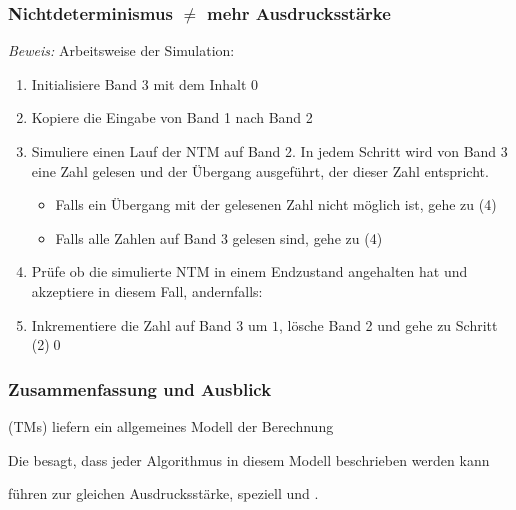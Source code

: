 \documentclass[onlymath]{beamer}
\begin{document}
\begin{frame}[t]\frametitle{Nichtdeterminismus $\neq$ mehr Ausdrucksstärke}


\emph{Beweis:} Arbeitsweise der Simulation:
\begin{enumerate}[(1)]
\item Initialisiere Band 3 mit dem Inhalt $0$
\item Kopiere die Eingabe von Band 1 nach Band 2
\item Simuliere einen Lauf der NTM auf Band 2. In jedem Schritt wird von Band 3 eine Zahl gelesen
und der Übergang ausgeführt, der dieser Zahl entspricht.
\begin{itemize}
\item Falls ein Übergang mit der gelesenen Zahl nicht möglich ist, gehe zu (4)
\item Falls alle Zahlen auf Band 3 gelesen sind, gehe zu (4)
\end{itemize}
\item Prüfe ob die simulierte NTM in einem Endzustand angehalten hat und akzeptiere in diesem Fall, andernfalls:
\item Inkrementiere die Zahl auf Band 3 um $1$, lösche Band 2 und gehe zu Schritt (2)\qed
\end{enumerate}

\end{frame}

% 
% 
% 

\begin{frame}\frametitle{Zusammenfassung und Ausblick}

 (TMs) liefern ein allgemeines Modell der Berechnung
\bigskip

Die  besagt, dass jeder Algorithmus in diesem Modell beschrieben werden kann
\bigskip

 führen zur gleichen Ausdrucksstärke, speziell  und .
\bigskip


\end{frame}
\end{document}
